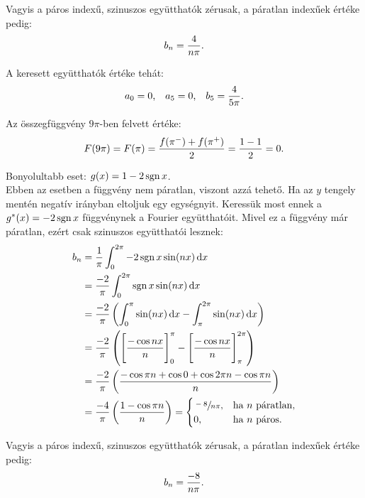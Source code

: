 \documentclass[exercise]{math-standalone}
\begin{document}
\begin{exercise}
{    Vagyis a páros indexű, szinuszos együtthatók zérusak, a páratlan indexűek
    értéke pedig:
    \[
      b_n = \frac{4}{n\pi}
      \text.
    \]

    A keresett együtthatók értéke tehát:
    \[
      a_0 = 0
      \text,
      \quad
      a_5 = 0
      \text,
      \quad
      b_5 = \frac{4}{5 \pi}
      \text.
    \]

    Az összegfüggvény $9\pi$-ben felvett értéke:
    \[
      F(9 \pi) = F(\pi) = \frac{f(\pi^-) + f(\pi^+)}{2} = \frac{1-1}{2} = 0
      \text.
    \]

    \tcbline

    Bonyolultabb eset: $g(x) = 1 - 2\operatorname{sgn} x$. \\[3mm]
    Ebben az esetben a függvény nem páratlan, viszont azzá tehető. Ha az $y$
    tengely mentén negatív irányban eltoljuk egy egységnyit. Keressük most ennek
    a $g^*(x) = -2 \operatorname{sgn} x$ függvénynek a Fourier együtthatóit. Mivel ez a
    függvény már páratlan, ezért csak szinuszos együtthatói lesznek:
    \begin{align*}
      b_n
       & = \frac{1}{\pi} \int_0^{2\pi} -2\sgn x \sin(n x) \, \mathrm d x
      \\
       & = \frac{-2}{\pi} \int_0^{2\pi} \sgn x \sin(n x) \, \mathrm d x
      \\
       & = \frac{-2}{\pi} \left(
      \int_0^{\pi} \sin(n x) \, \mathrm d x -
      \int_\pi^{2\pi} \sin(n x) \, \mathrm d x
      \right)
      \\
       & = \frac{-2}{\pi} \left(
      \Bigg[ \frac{-\cos nx}{n} \Bigg]_{0}^{\pi} -
      \Bigg[ \frac{-\cos nx}{n} \Bigg]_{\pi}^{2\pi}
      \right)
      \\
       & = \frac{-2}{\pi} \left(
      \frac{%
        - \cos \pi n
        + \cos 0
        + \cos 2 \pi n
        - \cos \pi n
      }{n}
      \right)
      \\
       & = \frac{-4}{\pi} \left(
      \frac{1 - \cos \pi n}{n}
      \right)
      = \begin{cases}
          \sfrac{-8}{n \pi}, & \text{ha } n \text{ páratlan,} \\
          0,                 & \text{ha } n \text{ páros.}
        \end{cases}
    \end{align*}

    Vagyis a páros indexű, szinuszos együtthatók zérusak, a páratlan indexűek
    értéke pedig:
    \[
      b_n = \frac{-8}{n\pi}
      \text.
    \]

}
\end{exercise}
\end{document}
